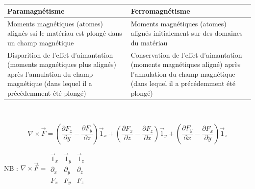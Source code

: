 \documentclass	[11pt, a4paper, openany]{book}
\begin{document}
		\\\\
		\renewcommand{\arraystretch}{1.8}
		\begin{tabular}{|p{7.55cm}|p{7.55cm}|}
			\hline
			Paramagnétisme                                                                                                                                                     & Ferromagnétisme                                                                                                                                               \\
			\hline
			Moments magnétiques (atomes) alignés  ssi le matériau est plongé dans un champ magnétique                                                                      & Moments magnétiques (atomes) alignés initialement sur des domaines du matériau                                                                              \\
			\hline
			Disparition de l'effet d'aimantation (moments magnétiques plus alignés) après l'annulation du champ magnétique (dans lequel il a précédemment été  plongé) & Conservation de l'effet d'aimantation (moments magnétiques aligné) après l'annulation du champ magnétique (dans lequel il a précédemment été  plongé) \\
			\hline
		\end{tabular}\\
		
		
		$$ \nabla \times \vec F = \left(\frac{\partial F_z}{\partial y} - \frac{\partial F_y}{\partial z}\right)\vec 1_x + \left(\frac{\partial F_x}{\partial z} - \frac{\partial F_z}{\partial x}\right)\vec 1_y + \left(\frac{\partial F_y}{\partial x} - \frac{\partial F_x}{\partial y}\right)\vec 1_z $$
		
		NB : $ \nabla \times \vec F = \begin{array}{|ccc|}
		\vec 1_x & \vec 1_y & \vec  1_z \\ 
		\partial_x & \partial_y & \partial_z \\ 
		F_x & F_y & F_z
		\end{array} $
		
		
\end{document}
